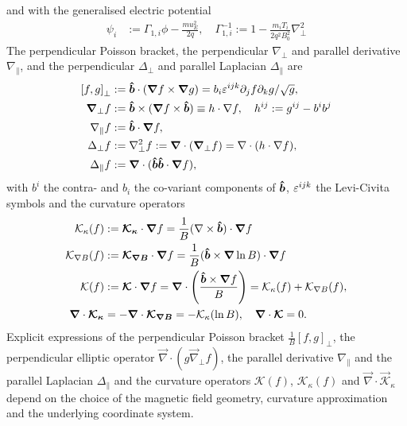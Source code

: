 and with the generalised electric potential
\begin{align}
  \psi_i&:= \Gamma_{1,i} \phi - \frac{m u_E^2}{2 q}, \quad \Gamma_{1,i}^{-1} := 1-\frac{m_i T_i}{2q^2 B_0^2} \nabla_\perp^2
\end{align}
The perpendicular Poisson bracket, the perpendicular \(\nabla_\perp\) and parallel derivative \(\nabla_\parallel\),
and the perpendicular \(\Delta_\perp\) and parallel Laplacian \(\Delta_\parallel\) are
\begin{align}\label{eq:perppoiss}
 \left[f,g\right]_\perp &:= \bm{\hat{b}} \cdot \left({\boldsymbol{\nabla}} f \times {\boldsymbol{\nabla}} g\right) =
    b_i \varepsilon^{ijk}\partial_j f\partial_k g/\sqrt{g}, \\
 {\boldsymbol{\nabla}}_\perp f &:= \bm{\hat{b}}\times({\boldsymbol{\nabla}} f\times \bm{\hat{b}} ) \equiv
    h \cdot \nabla f, \quad h^{ij} := g^{ij} - b^ib^j\\
 \nabla_\parallel f&:= \bm{\hat{b}}\cdot{\boldsymbol{\nabla}} f ,\\
 \Delta_\perp f&:= \nabla_\perp^2 f:= {\boldsymbol{\nabla}}\cdot ({\boldsymbol{\nabla}}_\perp f)
    = \nabla\cdot( h\cdot\nabla f),  \\
 \Delta_\parallel f&:= {\boldsymbol{\nabla}} \cdot ( \bm{\hat{b}}\bm{\hat{b}}\cdot{\boldsymbol{\nabla}} f ),
\end{align}
with $b^i$ the contra- and $b_i$ the co-variant components of $\bm{\hat{b}}$,
$\varepsilon^{ijk}$ the Levi-Civita symbols
and the curvature operators
\begin{align}\label{eq:curvopgen}
  \mathcal K_\kappa(f) &:= {\boldsymbol{ \mathcal K_\kappa }}\cdot {\boldsymbol{\nabla}} f = \frac{1}{B}(\nabla \times \bm{\hat{b}})\cdot {\boldsymbol{\nabla}} f \\
  \mathcal K_{\nabla B}(f) &:= {\boldsymbol{\mathcal K_{\nabla B}}} \cdot {\boldsymbol{\nabla}} f = \frac{1}{B}(\bm{\hat{b}} \times {\boldsymbol{\nabla}} \ln B)\cdot {\boldsymbol{\nabla}} f \\
  \mathcal{K}(f)&:={\boldsymbol{\mathcal K}} \cdot {\boldsymbol{\nabla}} f = {\boldsymbol{\nabla}} \cdot \left(\frac{ \bm{\hat{b}} \times {\boldsymbol{\nabla}} f}{B} \right) = \mathcal K_\kappa(f) + \mathcal K_{\nabla B}(f),\\
  {\boldsymbol{\nabla}} \cdot {\boldsymbol{\mathcal K_\kappa}} &= -{\boldsymbol{\nabla}} \cdot {\boldsymbol{\mathcal K_{\nabla B}}} = -\mathcal K_\kappa(\ln B)
  ,\quad {\boldsymbol{\nabla}}\cdot{\boldsymbol{ \mathcal K}} = 0.
\end{align}
Explicit expressions of the perpendicular Poisson bracket \( \frac{1}{B}\left[f,g\right]_\perp\), the perpendicular elliptic operator \( \vec{\nabla}\cdot\left(g \vec{\nabla}_\perp f\right)\),
the parallel derivative \(\nabla_\parallel\) and the parallel Laplacian \(\Delta_\parallel\) and  the curvature operators \(\mathcal{K}(f)\),
\(\mathcal{K}_\kappa(f)\) and \(\vec{\nabla} \cdot  \vec{\mathcal{K}}_{\kappa} \)
depend on the choice of the magnetic field geometry, curvature approximation and the underlying coordinate system.
